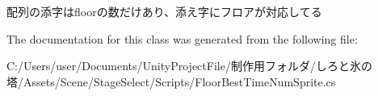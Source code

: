 配列の添字はfloorの数だけあり、添え字にフロアが対応してる 



The documentation for this class was generated from the following file\+:\begin{DoxyCompactItemize}
\item 
C\+:/\+Users/user/\+Documents/\+Unity\+Project\+File/制作用フォルダ/しろと氷の塔/\+Assets/\+Scene/\+Stage\+Select/\+Scripts/Floor\+Best\+Time\+Num\+Sprite.\+cs\end{DoxyCompactItemize}

